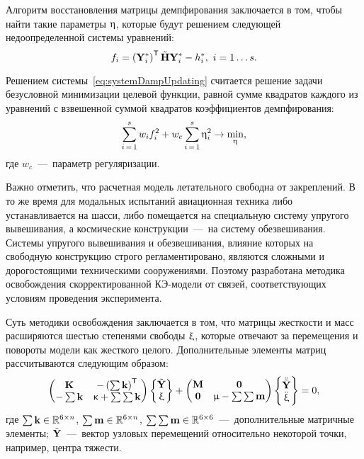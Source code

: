 Алгоритм восстановления матрицы демпфирования заключается в том, чтобы найти такие параметры $ \mathbf{\upeta} $, которые будут решением следующей недоопределенной системы уравнений:
\begin{equation}
	f_i = \left( \mathbf{Y}_i ^ \ast \right) ^ \mathsf{T} \tilde{\mathbf{H}} \mathbf{Y}_i ^ \ast - h_i ^ \ast, \ i = 1 \hdots s. \label{eq:systemDampUpdating}
\end{equation}

Решением системы~\eqref{eq:systemDampUpdating} считается решение задачи безусловной минимизации целевой функции, равной сумме квадратов каждого из уравнений с взвешенной суммой квадратов коэффициентов демпфирования:
\begin{equation}
	\sum \limits_{i\,=\,1} ^ s w_i f_i ^ 2 + w_c \sum \limits_{i\,=\,1}^s \upeta_i ^ 2 \rightarrow \min_{\mathbf{\upeta}},
	\label{eq:objFinalDampFunUpdating}
\end{equation}
где $ w_c $~---~параметр регуляризации.

Важно отметить, что расчетная модель летательного свободна от закреплений. В то же время для модальных испытаний авиационная техника либо устанавливается на шасси, либо помещается на специальную систему упругого вывешивания, а космические конструкции~---~на систему обезвешивания. Системы упругого вывешивания и обезвешивания, влияние которых на свободную конструкцию строго регламентировано, являются сложными и дорогостоящими техническими сооружениями. Поэтому разработана методика освобождения скорректированной КЭ-модели от связей, соответствующих условиям проведения эксперимента. 

Суть методики освобождения заключается в том, что матрицы жесткости и масс расширяются шестью степенями свободы $ \mathbf{\upxi} $, которые отвечают за перемещения и повороты модели как жесткого целого. Дополнительные элементы матриц рассчитываются следующим образом:
\begin{equation}
	\begin{pmatrix}
		\mathbf{K} & -\left( \sum \mathbf{k} \right) ^ \mathsf{T} \\
		 -\sum \mathbf{k} & \upkappa + \sum \sum \mathbf{k}
	\end{pmatrix}
	\begin{Bmatrix}
		\tilde{\mathbf{Y}} \\
		\upxi
	\end{Bmatrix}
	+
	\begin{pmatrix}
		\mathbf{M} & \mathbf{0} \\
		\mathbf{0} & \upmu - \sum \sum \mathbf{m}
	\end{pmatrix}
		\begin{Bmatrix}
		\ddot{\tilde{\mathbf{Y}}} \\
		\ddot{\upxi}
	\end{Bmatrix}
	= 0,
\end{equation}
где $ \sum \mathbf{k} \in \mathbb{R}^{6 \times n}$, $ \sum \mathbf{m} \in \mathbb{R}^{6 \times n}$, $ \sum \sum \mathbf{m} \in \mathbb{R}^{6 \times 6} $~---~дополнительные матричные элементы; $ \tilde{\mathbf{Y}} $~---~вектор узловых перемещений относительно некоторой точки, например, центра тяжести.

